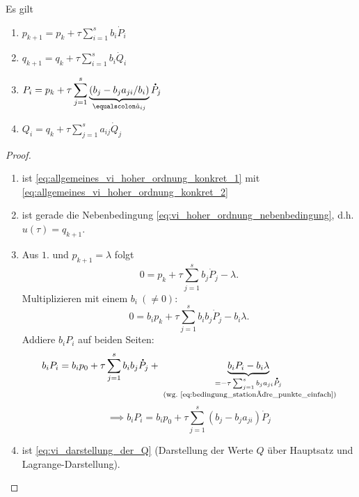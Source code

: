 \begin{lemma}
	Es gilt
	\begin{enumerate}[label=(\arabic*)]
		\item $\displaystyle p_{k+1} = p_k + \tau\sum_{i=1}^s b_i\dot{P}_i$
		\item $\displaystyle q_{k+1} = q_k + \tau\sum_{i=1}^s b_i\dot{Q}_i$
		\item $\displaystyle P_i = p_k + \tau\sum_{j=1}^s \underbrace{( b_j - b_ja_{ji}/b_i)}_{\equalscolon \hat{a}_{ij}} \dot{P}_j$
		\item $\displaystyle Q_i = q_k + \tau\sum_{j=1}^s a_{ij}\dot{Q}_j$
	\end{enumerate}
\end{lemma}

\begin{proof}
	\begin{enumerate}[label=(\arabic*)]
		\item ist \eqref{eq:allgemeines_vi_hoher_ordnung_konkret_1} mit \eqref{eq:allgemeines_vi_hoher_ordnung_konkret_2}
		\item ist gerade die Nebenbedingung \eqref{eq:vi_hoher_ordnung_nebenbedingung}, d.h. $u(\tau)=q_{k+1}$.
		\item Aus $1.$ und $p_{k+1}=\lambda$ folgt
		\begin{equation*}
		0 = p_k + \tau\sum_{j=1}^s b_j\dot{P}_j - \lambda.
		\end{equation*}
		Multiplizieren mit einem $b_i\ (\neq 0)$:
		\begin{equation*}
		0 = b_ip_k + \tau\sum_{j=1}^s b_ib_j\dot{P}_j - b_i\lambda.
		\end{equation*}
		Addiere $b_iP_i$ auf beiden Seiten:
		\begin{equation*}
		b_i P_i
		=
		b_ip_0 + \tau\sum_{j=1}^s b_ib_j\dot{P}_j
		+ \underbrace{b_iP_i - b_i\lambda}_{\substack{=-\tau\sum_{j=1}^sb_ja_{ji}\dot{P}_j\\\text{ (wg.~\eqref{eq:bedingung_stationäre_punkte_einfach})}}}
		\end{equation*}
		\begin{equation*}
		\implies b_iP_i = b_ip_0 + \tau\sum_{j=1}^s ( b_j - b_ja_{ji}) \dot{P}_j
		\end{equation*}
		
		\item ist \eqref{eq:vi_darstellung_der_Q} (Darstellung der Werte $Q$ über Hauptsatz und Lagrange-Darstellung).
	\end{enumerate}
\end{proof}


